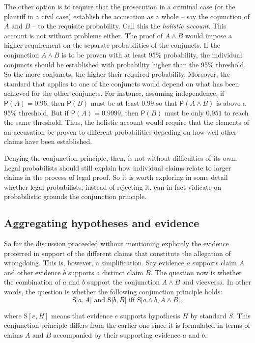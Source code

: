 \documentclass[10pt,dvipsnames,enabledeprecatedfontcommands]{scrartcl}
\newcommand{\et}{\wedge}
\newcommand{\pr}[1]{\mathsf{P}(#1)}
\begin{document}
The other option is to require that the prosecution in a criminal case
(or the plantiff in a civil case) establish the accusation as a whole --
say the cojunction of \(A\) and \(B\) -- to the requisite probability.
Call this the \textit{holistic account}. This account is not without
problems either. The proof of \(A\et B\) would impose a higher
requirement on the separate probabilities of the conjuncts. If the
conjunction \(A\et B\) is to be proven with at least 95\% probability,
the individual conjuncts should be established with probability higher
than the 95\% threshold. So the more conjuncts, the higher their
required probability. Moreover, the standard that applies to one of the
conjuncts would depend on what has been achieved for the other
conjuncts. For instance, assuming independence, if \(\pr{A}=0.96\), then
\(\pr{B}\) must be at least \(0.99\) so that \(\pr{A\et B}\) is above a
95\% threshold. But if \(\pr{A}=0.9999\), then \(\pr{B}\) must be only
\(0.951\) to reach the same threshold. Thus, the holistic account would
require that the elements of an accusation be proven to different
probabilities depeding on how well other claims have been established.

Denying the conjunction principle, then, is not without difficulties of
its own. Legal probabilists should still explain how individual claims
relate to larger claims in the process of legal proof. So it is worth
exploring in some detail whether legal probabilists, instead of
rejecting it, can in fact vidicate on probabilistic grounds the
conjunction principle.

\hypertarget{aggregating-hypotheses-and-evidence}{%
\subsection{Aggregating hypotheses and
evidence}\label{aggregating-hypotheses-and-evidence}}

So far the discussion proceeded without mentioning explicitly the
evidence proferred in support of the different claims that constitute
the allegation of wrongdoing. This is, however, a simplification. Say
evidence \(a\) supports claim \(A\) and other evidence \(b\) supports a
distinct claim \(B\). The question now is whether the combination of
\(a\) and \(b\) support the conjunction \(A \et B\) and viceversa. In
other words, the question is whether the following conjunction principle
holds:
\[\text{S[$a, A$] and S[$b, B$] iff S[$a \wedge b, A\wedge B$]},\]

\noindent where \(\text{S}[e, H]\) means that evidence \(e\) supports
hypothesis \(H\) by standard \(S\). This conjunction principle differs
from the earlier one since it is formulated in terms of claims \(A\) and
\(B\) accompanied by their supporting evidence \(a\) and \(b\).
\end{document}
